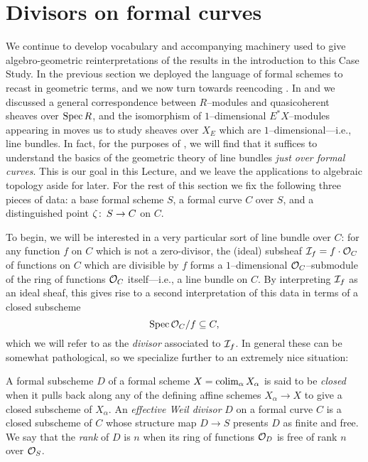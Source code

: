 \section{Divisors on formal curves}\label{CurveDivisorsSection}

We continue to develop vocabulary and accompanying machinery used to give algebro-geometric reinterpretations of the results in the introduction to this Case Study.  In the previous section we deployed the language of formal schemes to recast  in geometric terms, and we now turn towards reencoding .  In  and  we discussed a general correspondence between \(R\)--modules and quasicoherent sheaves over \(\operatorname{Spec} R\), and the isomorphism of \(1\)--dimensional \(E^* X\)--modules appearing in  moves us to study sheaves over \(X_E\) which are \(1\)--dimensional---i.e., line bundles.  In fact, for the purposes of , we will find that it suffices to understand the basics of the geometric theory of line bundles \emph{just over formal curves}.  This is our goal in this Lecture, and we leave the applications to algebraic topology aside for later.  For the rest of this section we fix the following three pieces of data: a base formal scheme \(S\), a formal curve \(C\) over \(S\), and a distinguished point \(\zeta\colon\thinspace S \to C\) on \(C\).

To begin, we will be interested in a very particular sort of line bundle over \(C\): for any function \(f\) on \(C\) which is not a zero-divisor, the (ideal) subsheaf \(\mathcal{I}_f = f \cdot \mathcal{O}_C\) of functions on \(C\) which are divisible by \(f\) forms a \(1\)--dimensional \(\mathcal{O}_C\)--submodule of the ring of functions \(\mathcal{O}_C\) itself---i.e., a line bundle on \(C\).  By interpreting \(\mathcal{I}_f\) as an ideal sheaf, this gives rise to a second interpretation of this data in terms of a closed subscheme \[\operatorname{Spec} \mathcal{O}_C / f \subseteq C,\] which we will refer to as the \textit{divisor} associated to \(\mathcal{I}_f\).  In general these can be somewhat pathological, so we specialize further to an extremely nice situation:

\begin{definition}
A formal subscheme \(D\) of a formal scheme \(X = \operatorname*{colim}_\alpha X_\alpha\) is said to be \textit{closed} when it pulls back along any of the defining affine schemes \(X_\alpha \to X\) to give a closed subscheme of \(X_\alpha\).  An \textit{effective Weil divisor} \(D\) on a formal curve \(C\) is a closed subscheme of \(C\) whose structure map \(D \to S\) presents \(D\) as finite and free.  We say that the \textit{rank} of \(D\) is \(n\) when its ring of functions \(\mathcal{O}_D\) is free of rank \(n\) over \(\mathcal{O}_S\).
\end{definition}

